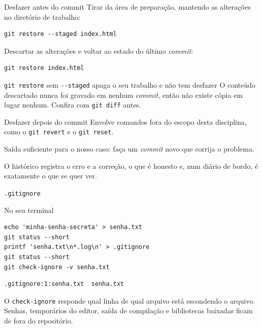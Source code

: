\documentclass{beamer}
\newcommand{\ddash}{-\mbox{}-}
\newenvironment{noterminal}
  {\begin{exampleblock}{No seu terminal}}
  {\end{exampleblock}}
\begin{document}
\begin{frame}[fragile]{Desfazer antes do commit}
  Tirar da área de preparação, mantendo as alterações no diretório de trabalho:

  \begin{verbatim}
git restore --staged index.html
  \end{verbatim}

  Descartar as alterações e voltar ao estado do último \textit{commit}:

  \begin{verbatim}
git restore index.html
  \end{verbatim}

  \begin{alertblock}{\texttt{git restore} sem \texttt{\ddash staged} apaga o seu
    trabalho e não tem desfazer}
    O conteúdo descartado nunca foi gravado em nenhum \textit{commit}, então não
    existe cópia em lugar nenhum. Confira com \texttt{git diff} antes.
  \end{alertblock}
\end{frame}

\begin{frame}{Desfazer depois do commit}
  Envolve comandos fora do escopo desta disciplina, como o \texttt{git revert} e
  o \texttt{git reset}.

  \vspace{0.5cm}
  Saída suficiente para o nosso caso: faça um \textit{commit} novo que corrija o
  problema.

  \vspace{0.5cm}
  O histórico registra o erro e a correção, o que é honesto e, num diário de
  bordo, é exatamente o que se quer ver.
\end{frame}

\begin{frame}[fragile]{\texttt{.gitignore}}
  \begin{noterminal}
    \begin{verbatim}
echo 'minha-senha-secreta' > senha.txt
git status --short
printf 'senha.txt\n*.log\n' > .gitignore
git status --short
git check-ignore -v senha.txt
    \end{verbatim}
  \end{noterminal}

  \begin{verbatim}
.gitignore:1:senha.txt	senha.txt
  \end{verbatim}

  O \texttt{check-ignore} responde qual linha de qual arquivo está escondendo o
  arquivo. Senhas, temporários do editor, saída de compilação e bibliotecas
  baixadas ficam de fora do repositório.
\end{frame}
\end{document}
